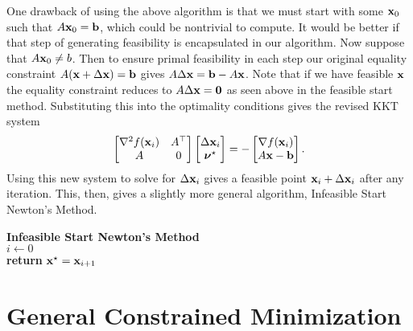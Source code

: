\documentclass[12pt,letterpaper]{article}
\begin{document}
One drawback of using the above algorithm is that we must start with some ${\bf x}_0$ such that
$A{\bf x}_0 = {\bf b}$, which could be nontrivial to compute. It would be better if that step of generating
feasibility is encapsulated in our algorithm. Now suppose that $A{\bf x}_0 \neq b$. Then to ensure primal
feasibility in each step our original equality constraint $A({\bf x} + \Delta{\bf x}) = {\bf b}$ gives
$A\Delta{\bf x} = {\bf b} - A{\bf x}$. Note that if we have feasible ${\bf x}$ the equality constraint reduces to
$A\Delta{\bf x} = {\bf 0}$ as seen above in the feasible start method. Substituting this into the optimality
conditions gives the revised KKT system
\[
    \begin{bmatrix} \nabla^2 f({\bf x}_i) & A^\top\\A & 0 \end{bmatrix} \begin{bmatrix} \Delta {\bf x}_i\\\hbox{\boldmath$\nu$}^\star \end{bmatrix} = -\begin{bmatrix} \nabla f({\bf x}_i)\\A{\bf x} - {\bf b} \end{bmatrix}.
\]
Using this new system to solve for $\Delta{\bf x}_i$ gives a feasible point ${\bf x}_i + \Delta{\bf x}_i$ after any iteration.
This, then, gives a slightly more general algorithm, Infeasible Start Newton's Method.

\IncMargin{1em}
\begin{algorithm}
    \textbf{Infeasible Start Newton's Method}\\
    $i \leftarrow 0$\\
    \textbf{return } ${\bf x}^\star = {\bf x}_{i+1}$
\end{algorithm}

\section{General Constrained Minimization}
\end{document}
